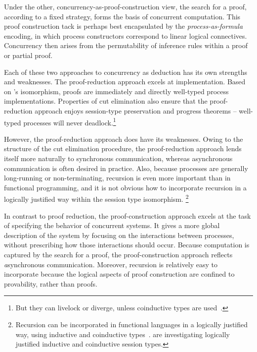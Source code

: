 Under the other, concurrency-as-proof-construction view, the search for a proof, according to a fixed strategy, forms the basis of concurrent computation.
This proof construction tack is perhaps best encapsulated by the \emph{process-as-formula} encoding, in which process constructors correspond to linear logical connectives\autocite{Miller:ELP92}.
Concurrency then arises from the permutability of inference rules within a proof or partial proof.

Each of these two approaches to concurrency as deduction has its own strengths and weaknesses.
The proof-reduction approach excels at
implementation.
Based on \citeauthor{Caires+:MSCS16}'s isomorphism, proofs are immediately and directly well-typed process implementations.
Properties of cut elimination also ensure that the proof-reduction approach enjoys session-type preservation and progress theorems -- well-typed processes will never deadlock.\footnote{But they can livelock or diverge, unless coinductive types are used~\parencite{Derakhshan+Pfenning:LMCS20}.}

However, the proof-reduction approach does have its weaknesses.
Owing to the structure of the cut elimination procedure, the proof-reduction approach lends itself more naturally to synchronous communication, whereas asynchronous communication is often desired in practice.
Also, because processes are generally long-running or non-terminating, recursion is even more important than in functional programming, and it is not obvious how to incorporate recursion in a logically justified way within the session type isomorphism.%
\footnote{Recursion can be incorporated in functional languages in a logically justified way, using inductive and coinductive types~\parencite{Mendler:LICS87}.
\Textcites{Derakhshan+Pfenning:LMCS20}{Somayyajula+Pfenning:20} are investigating logically justified inductive and coinductive session types.}

In contrast to proof reduction, the proof-construction approach excels at the task of specifying the behavior of concurrent systems.
It gives a more global description of the system by focusing on the interactions between processes, without prescribing how those interactions should occur.
Because computation is captured by the search for a proof, the proof-construction approach reflects \emph{a}synchronous communication.
Moreover, recursion is relatively easy to incorporate because the logical aspects of proof construction are confined to provability, rather than proofs.

